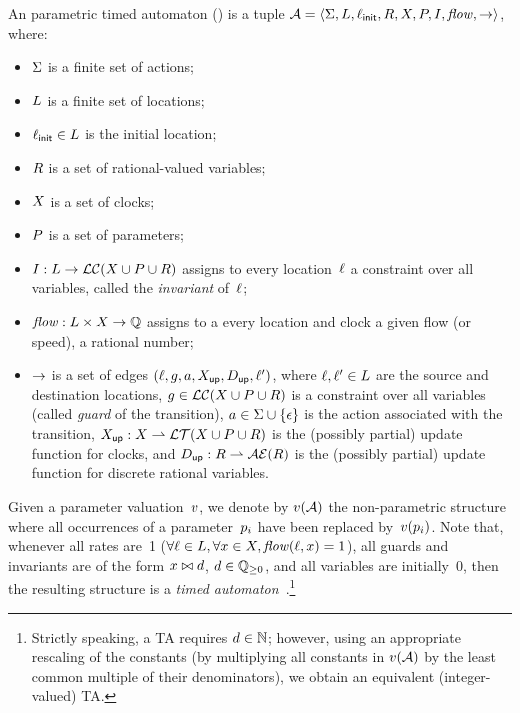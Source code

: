 \begin{definition}[\IPTA{}]\label{definition:IPTA}
	An \imitator{} parametric timed automaton (\emph{\IPTA{}}) is a tuple $\mathcal{A} = \langle\Sigma, L, \ell_{\textsf{init}}, R, X, P, I, \mathit{flow}, {\rightarrow}\rangle$, where:
	\begin{itemize}
		\item $\Sigma$ is a finite set of actions;
		\item $L$ is a finite set of locations;
		\item $\ell_{\textsf{init}} \in L$ is the initial location;
		\item $R$ is a set of rational-valued variables;
		\item $X$ is a set of clocks;
		\item $P$ is a set of parameters;
		\item $I : L \rightarrow \mathcal{LC}(X \cup P \cup R)$ assigns to every location~$\ell$ a constraint over all variables, called the \emph{invariant} of~$\ell$;
		\item $\mathit{flow} : L \times X \rightarrow \mathbb Q$ assigns to a every location and clock a given flow (or speed), \ie{} a rational number;
		\item ${\rightarrow}$ is a set of edges $(\ell, g, a, X_\mathsf{up}, D_\mathsf{up}, \ell')$, where
		      $\ell, \ell' \in L$ are the source and destination locations,
		      $g \in \mathcal{LC}(X \cup P \cup R)$ is a constraint over all variables (called \emph{guard} of the transition),
		      $a \in \Sigma \cup \{ \epsilon \}$ is the action associated with the transition,
		      $X_\mathsf{up} : X \rightharpoonup \mathcal{LT}(X \cup P \cup R)$ is the (possibly partial) update function for clocks, and
		      $D_\mathsf{up} : R \rightharpoonup \mathcal{AE}(R)$ is the (possibly partial) update function for discrete rational variables.
	\end{itemize}
\end{definition}

Given a parameter valuation~$v$, we denote by $v(\mathcal{A})$ the non-parametric structure where all occurrences of a parameter~$p_i$ have been replaced by~$v(p_i)$.
Note that, whenever
	all rates are~1 ($\forall \ell \in L, \forall x \in X, \mathit{flow}(\ell, x) = 1$),
	all guards and invariants are of the form $x \bowtie d$, $d \in \mathbb Q_{\geq 0}$,
	and
	all variables are initially~0, %
then
the resulting structure is a \emph{timed automaton}~\cite{AD94}.\footnote{%
	Strictly speaking, a TA requires $d \in \mathbb N$; however, using an appropriate rescaling of the constants (by multiplying all constants in $v(\mathcal{A})$ by the least common multiple of their denominators), we obtain an equivalent (integer-valued) TA.
}


